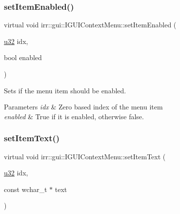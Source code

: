 \subsubsection{\texorpdfstring{set\+Item\+Enabled()}{setItemEnabled()}\hspace{0.1cm}{\footnotesize\ttfamily [2/2]}}
{\footnotesize\ttfamily virtual void irr\+::gui\+::\+I\+G\+U\+I\+Context\+Menu\+::set\+Item\+Enabled (\begin{DoxyParamCaption}\item[{\hyperlink{namespaceirr_a0416a53257075833e7002efd0a18e804}{u32}}]{idx,  }\item[{bool}]{enabled }\end{DoxyParamCaption})\hspace{0.3cm}{\ttfamily [pure virtual]}}



Sets if the menu item should be enabled. 


\begin{DoxyParams}{Parameters}
{\em idx} & Zero based index of the menu item \\
\hline
{\em enabled} & True if it is enabled, otherwise false. \\
\hline
\end{DoxyParams}
\mbox{\label{classirr_1_1gui_1_1IGUIContextMenu_a20d0e53213a2915a8a62c54b5aa2ff08}} 
\subsubsection{\texorpdfstring{set\+Item\+Text()}{setItemText()}\hspace{0.1cm}{\footnotesize\ttfamily [1/2]}}
{\footnotesize\ttfamily virtual void irr\+::gui\+::\+I\+G\+U\+I\+Context\+Menu\+::set\+Item\+Text (\begin{DoxyParamCaption}\item[{\hyperlink{namespaceirr_a0416a53257075833e7002efd0a18e804}{u32}}]{idx,  }\item[{const wchar\+\_\+t $\ast$}]{text }\end{DoxyParamCaption})\hspace{0.3cm}{\ttfamily [pure virtual]}}



